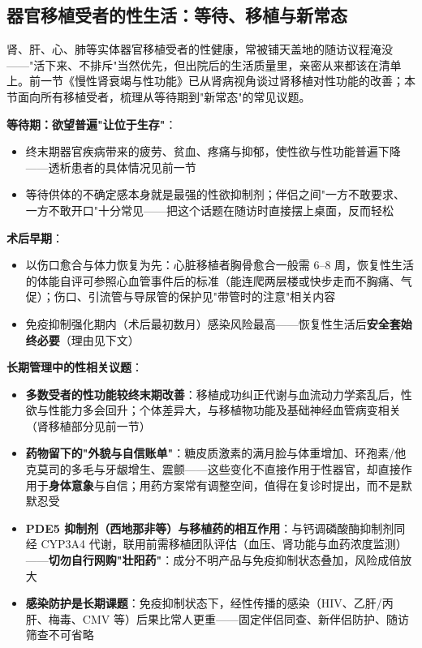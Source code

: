 \subsection{器官移植受者的性生活：等待、移植与新常态}

肾、肝、心、肺等实体器官移植受者的性健康，常被铺天盖地的随访议程淹没——"活下来、不排斥"当然优先，但出院后的生活质量里，亲密从来都该在清单上。前一节《慢性肾衰竭与性功能》已从肾病视角谈过肾移植对性功能的改善；本节面向所有移植受者，梳理从等待期到"新常态"的常见议题。

\vspace{0.5em}
\noindent\textbf{等待期：欲望普遍"让位于生存"}：

\begin{itemize}
	\item 终末期器官疾病带来的疲劳、贫血、疼痛与抑郁，使性欲与性功能普遍下降——透析患者的具体情况见前一节
	\item 等待供体的不确定感本身就是最强的性欲抑制剂；伴侣之间"一方不敢要求、一方不敢开口"十分常见——把这个话题在随访时直接摆上桌面，反而轻松
\end{itemize}

\vspace{0.5em}
\noindent\textbf{术后早期}：

\begin{itemize}
	\item 以伤口愈合与体力恢复为先：心脏移植者胸骨愈合一般需 6--8 周，恢复性生活的体能自评可参照心血管事件后的标准（能连爬两层楼或快步走而不胸痛、气促）；伤口、引流管与导尿管的保护见"带管时的注意"相关内容
	\item 免疫抑制强化期内（术后最初数月）感染风险最高——恢复性生活后\textbf{安全套始终必要}（理由见下文）
\end{itemize}

\vspace{0.5em}
\noindent\textbf{长期管理中的性相关议题}：

\begin{itemize}
	\item \textbf{多数受者的性功能较终末期改善}：移植成功纠正代谢与血流动力学紊乱后，性欲与性能力多会回升；个体差异大，与移植物功能及基础神经血管病变相关（肾移植部分见前一节）
	\item \textbf{药物留下的"外貌与自信账单"}：糖皮质激素的满月脸与体重增加、环孢素/他克莫司的多毛与牙龈增生、震颤——这些变化不直接作用于性器官，却直接作用于\textbf{身体意象}与自信；用药方案常有调整空间，值得在复诊时提出，而不是默默忍受
	\item \textbf{PDE5 抑制剂（西地那非等）与移植药的相互作用}：与钙调磷酸酶抑制剂同经 CYP3A4 代谢，联用前需移植团队评估（血压、肾功能与血药浓度监测）——\textbf{切勿自行网购"壮阳药"}：成分不明产品与免疫抑制状态叠加，风险成倍放大
	\item \textbf{感染防护是长期课题}：免疫抑制状态下，经性传播的感染（HIV、乙肝/丙肝、梅毒、CMV 等）后果比常人更重——固定伴侣同查、新伴侣防护、随访筛查不可省略
\end{itemize}

